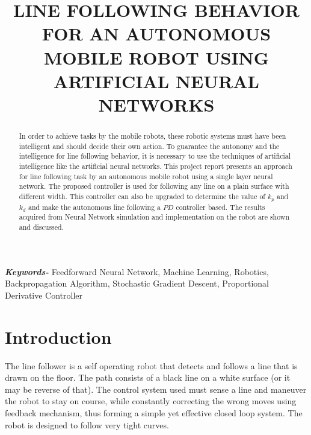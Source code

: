 \documentclass[14pt,a4paper]{extarticle}
\begin{document}
\title{LINE FOLLOWING BEHAVIOR FOR AN AUTONOMOUS MOBILE ROBOT USING ARTIFICIAL NEURAL NETWORKS}



\author{}

\date{}

\maketitle

\newpage

\tableofcontents

\newpage


\begin{abstract}

In order to achieve tasks by the mobile robots, these robotic systems must have been intelligent and should decide their own action. To guarantee the autonomy and the intelligence for line following behavior, it is necessary to use the techniques of artificial intelligence like the artificial neural networks. This project report presents an approach for line following task by an autonomous mobile robot using a single layer neural network. The proposed controller is used for following any line on a plain surface with different width. This controller can also be upgraded to determine the value of $k_{p}$ and $k_{d}$ and make the autonomous line following a $PD$ controller based. The results acquired from Neural Network simulation and implementation on the robot are shown and discussed.

\end{abstract}

\providecommand{\keywords}[1]{\textbf{\textit{Keywords-}} #1}

\keywords{Feedforward Neural Network, Machine Learning, Robotics, Backpropagation Algorithm, Stochastic Gradient Descent, Proportional Derivative Controller}

\section{Introduction}

The line follower is a self operating robot that detects and follows a line that is drawn on the floor. The path consists of a black line on a white surface (or it may be reverse of that). The control system used must sense a line and maneuver the robot to stay on course, while constantly correcting the wrong moves using feedback mechanism, thus forming a simple yet effective closed loop system. The robot is designed to follow very tight curves. 
\end{document}
